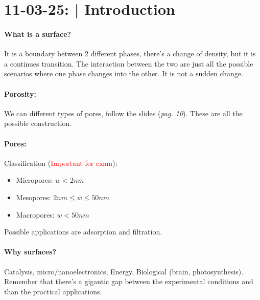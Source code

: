 \section{11-03-25: | Introduction}
\paragraph{What is a surface?} It is a boundary between 2 different phases, there's a change of density, but it is a continues transition. The interaction between the two are just all the possible scenarios where one phase changes into the other. It is not a sudden change.

\paragraph{Porosity:} We can different types of pores, follow the slides (\textit{pag. 10}). These are all the possible construction.

\paragraph{Pores:} Classification (\textcolor{red}{Important for exam}):
\begin{itemize}
    \item Micropores: $w < 2nm$
    \item Mesopores: $2nm \leq w \leq 50nm$
    \item Macropores: $w < 50nm$
\end{itemize}
Possible applications are adsorption and filtration.

\paragraph{Why surfaces?} Catalysis, micro/nanoelectronics, Energy, Biological (brain, photosynthesis). Remember that there's a gigantic gap between the experimental conditions and than the practical applications.